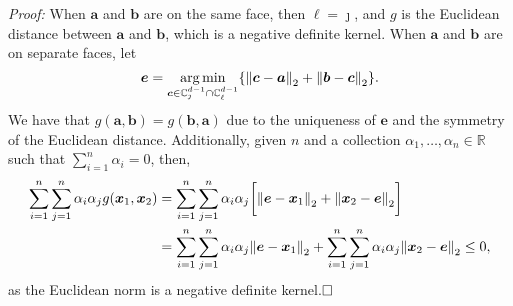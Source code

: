 {\em Proof:}
When $\bm{a}$ and $\bm{b}$ are on the same face, then $\ell = \jmath$, and $g$ is the Euclidean distance between $\bm{a}$ and $\bm{b}$, which is a  negative definite kernel.  When $\bm{a}$ and $\bm{b}$ are on separate
  faces, let 
  \[\bm{e} = 
    \argmin_{\bm{c} \in{\mathbb C}_{\jmath}^{d-1}\cap{\mathbb C}_{\ell}^{d-1}}\left\{ 
        \pnorm{\bm{c}-\bm{a}}{2} + \pnorm{\bm{b}-\bm{c}}{2} \right\}.
  \]
  We have that $g(\bm{a}, \bm{b}) = g(\bm{b}, \bm{a})$ due to the uniqueness of $\bm{e}$ and the symmetry of the Euclidean distance. Additionally, given $n$ and  a collection $\alpha_1,\ldots,\alpha_n\in{\mathbb R}$ such that  $\sum_{i = 1}^n\alpha_i = 0$, then, 
  \begin{equation*}
    \begin{aligned}
      \sum_{i = 1}^n\sum_{j = 1}^n \alpha_i\alpha_j g(\bm{x}_1,\bm{x}_2) &= \sum_{i = 1}^n\sum_{j = 1}^n \alpha_i\alpha_j \bigg[\pnorm{\bm{e} - \bm{x}_1}{2} + \pnorm{\bm{x}_2 - \bm{e}}{2}\bigg]\\
      &= \sum_{i = 1}^n\sum_{j = 1}^n \alpha_i\alpha_j\pnorm{\bm{e} - \bm{x}_1}{2} + \sum_{i = 1}^n\sum_{j = 1}^n \alpha_i\alpha_j\pnorm{\bm{x}_2 - \bm{e}}{2} \leq0,
    \end{aligned}
  \end{equation*}
  as the Euclidean norm is a negative definite kernel.$\hfill\Box$
 
